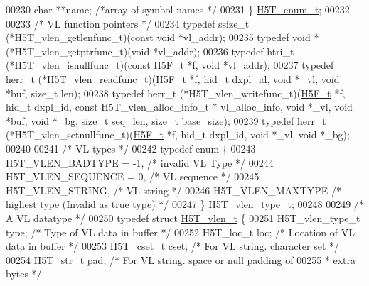 \begin{DoxyCode}
00230     \textcolor{keywordtype}{char}    **name;     \textcolor{comment}{/*array of symbol names          */}
00231 \} \hyperlink{struct_h5_t__enum__t}{H5T\_enum\_t};
00232 
00233 \textcolor{comment}{/* VL function pointers */}
00234 \textcolor{keyword}{typedef} ssize\_t (*H5T\_vlen\_getlenfunc\_t)(\textcolor{keyword}{const} \textcolor{keywordtype}{void} *vl\_addr);
00235 \textcolor{keyword}{typedef} \textcolor{keywordtype}{void} * (*H5T\_vlen\_getptrfunc\_t)(\textcolor{keywordtype}{void} *vl\_addr);
00236 \textcolor{keyword}{typedef} htri\_t (*H5T\_vlen\_isnullfunc\_t)(\textcolor{keyword}{const} \hyperlink{struct_h5_f__t}{H5F\_t} *f, \textcolor{keywordtype}{void} *vl\_addr);
00237 \textcolor{keyword}{typedef} herr\_t (*H5T\_vlen\_readfunc\_t)(\hyperlink{struct_h5_f__t}{H5F\_t} *f, hid\_t dxpl\_id, \textcolor{keywordtype}{void} *\_vl, \textcolor{keywordtype}{void} *buf, \textcolor{keywordtype}{size\_t} len);
00238 \textcolor{keyword}{typedef} herr\_t (*H5T\_vlen\_writefunc\_t)(\hyperlink{struct_h5_f__t}{H5F\_t} *f, hid\_t dxpl\_id, \textcolor{keyword}{const} H5T\_vlen\_alloc\_info\_t *
      vl\_alloc\_info, \textcolor{keywordtype}{void} *\_vl, \textcolor{keywordtype}{void} *buf, \textcolor{keywordtype}{void} *\_bg, \textcolor{keywordtype}{size\_t} seq\_len, \textcolor{keywordtype}{size\_t} base\_size);
00239 \textcolor{keyword}{typedef} herr\_t (*H5T\_vlen\_setnullfunc\_t)(\hyperlink{struct_h5_f__t}{H5F\_t} *f, hid\_t dxpl\_id, \textcolor{keywordtype}{void} *\_vl, \textcolor{keywordtype}{void} *\_bg);
00240 
00241 \textcolor{comment}{/* VL types */}
00242 \textcolor{keyword}{typedef} \textcolor{keyword}{enum} \{
00243     H5T\_VLEN\_BADTYPE =  -1, \textcolor{comment}{/* invalid VL Type */}
00244     H5T\_VLEN\_SEQUENCE = 0,  \textcolor{comment}{/* VL sequence */}
00245     H5T\_VLEN\_STRING,        \textcolor{comment}{/* VL string */}
00246     H5T\_VLEN\_MAXTYPE        \textcolor{comment}{/* highest type (Invalid as true type) */}
00247 \} H5T\_vlen\_type\_t;
00248 
00249 \textcolor{comment}{/* A VL datatype */}
00250 \textcolor{keyword}{typedef} \textcolor{keyword}{struct }\hyperlink{struct_h5_t__vlen__t}{H5T\_vlen\_t} \{
00251     H5T\_vlen\_type\_t     type;   \textcolor{comment}{/* Type of VL data in buffer */}
00252     H5T\_loc\_t       loc;    \textcolor{comment}{/* Location of VL data in buffer */}
00253     H5T\_cset\_t          cset;   \textcolor{comment}{/* For VL string. character set */}
00254     H5T\_str\_t           pad;    \textcolor{comment}{/* For VL string.  space or null padding of}
00255 \textcolor{comment}{                                 * extra bytes */}

\end{DoxyCode}
